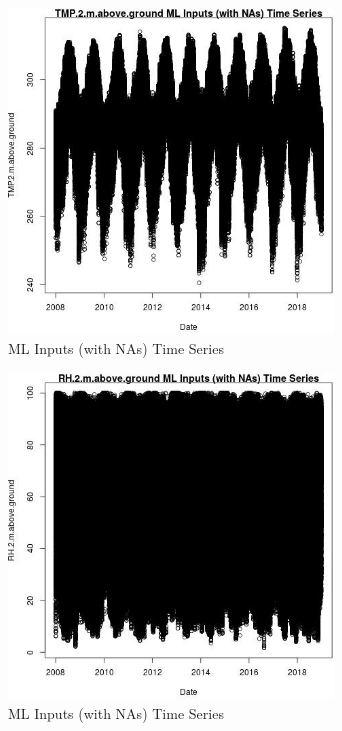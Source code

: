 \begin{figure} 
\centering  
\includegraphics[width=0.77\textwidth]{Code_Outputs/Report_ML_input_PM25_Step4_part_f_de_duplicated_aves_prioritize_24hr_obswNAs_TMP2mabovegroundvDate.jpg} 
\caption{\label{fig:Report_ML_input_PM25_Step4_part_f_de_duplicated_aves_prioritize_24hr_obswNAsTMP2mabovegroundvDate}ML Inputs (with NAs) Time Series} 
\end{figure} 
 

\begin{figure} 
\centering  
\includegraphics[width=0.77\textwidth]{Code_Outputs/Report_ML_input_PM25_Step4_part_f_de_duplicated_aves_prioritize_24hr_obswNAs_RH2mabovegroundvDate.jpg} 
\caption{\label{fig:Report_ML_input_PM25_Step4_part_f_de_duplicated_aves_prioritize_24hr_obswNAsRH2mabovegroundvDate}ML Inputs (with NAs) Time Series} 
\end{figure} 
 

